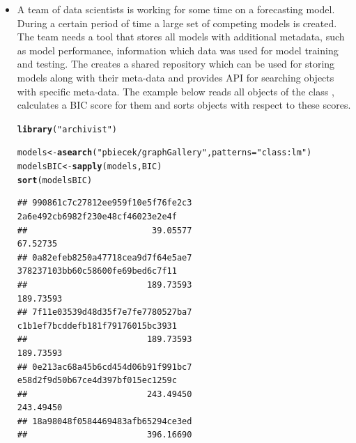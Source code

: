 \documentclass[nojss]{jss}\usepackage[]{graphicx}\usepackage[]{color}
\makeatletter
\newcommand{\hlstr}[1]{\textcolor[rgb]{0.192,0.494,0.8}{#1}}%
\newcommand{\hlstd}[1]{\textcolor[rgb]{0.345,0.345,0.345}{#1}}%
\newcommand{\hlkwb}[1]{\textcolor[rgb]{0.69,0.353,0.396}{#1}}%
\newcommand{\hlkwc}[1]{\textcolor[rgb]{0.333,0.667,0.333}{#1}}%
\newcommand{\hlkwd}[1]{\textcolor[rgb]{0.737,0.353,0.396}{\textbf{#1}}}%
\newenvironment{kframe}{%
 \def\at@end@of@kframe{}%
 \ifinner\ifhmode%
  \def\at@end@of@kframe{\end{minipage}}%
  \begin{minipage}{\columnwidth}%
 \fi\fi%
 \def\FrameCommand##1{\hskip\@totalleftmargin \hskip-\fboxsep
 \colorbox{shadecolor}{##1}\hskip-\fboxsep
     \hskip-\linewidth \hskip-\@totalleftmargin \hskip\columnwidth}%
 \MakeFramed {\advance\hsize-\width
   \@totalleftmargin\z@ \linewidth\hsize
   \@setminipage}}%
 {\par\unskip\endMakeFramed%
 \at@end@of@kframe}
\newenvironment{knitrout}{}{} %
\makeatother
\begin{document}
\begin{itemize}
\item A team of data scientists is working for some time on a forecasting model. During a certain period of time a large set of competing models is created. The team needs a tool that stores all models with additional metadata, such as model performance, information which data was used for model training and testing. The  creates a shared repository which can be used for storing models along with their meta-data and provides API for searching objects with specific meta-data. The example below reads all objects of the class , calculates a BIC score for them and sorts objects with respect to these scores.

\begin{knitrout}
\color{fgcolor}\begin{kframe}
\begin{alltt}
\hlkwd{library}\hlstd{(}\hlstr{"archivist"}\hlstd{)}
\end{alltt}


{\ttfamily\noindent\itshape\color{messagecolor}{\#\# Welcome to archivist (version: 2.1.2).}}\end{kframe}
\end{knitrout}
\begin{knitrout}
\color{fgcolor}\begin{kframe}
\begin{alltt}
\hlstd{models} \hlkwb{<-} \hlkwd{asearch}\hlstd{(}\hlstr{"pbiecek/graphGallery"}\hlstd{,} \hlkwc{patterns} \hlstd{=} \hlstr{"class:lm"}\hlstd{)}
\hlstd{modelsBIC} \hlkwb{<-} \hlkwd{sapply}\hlstd{(models, BIC)}
\hlkwd{sort}\hlstd{(modelsBIC)}
\end{alltt}
\begin{verbatim}
## 990861c7c27812ee959f10e5f76fe2c3 2a6e492cb6982f230e48cf46023e2e4f 
##                         39.05577                         67.52735 
## 0a82efeb8250a47718cea9d7f64e5ae7 378237103bb60c58600fe69bed6c7f11 
##                        189.73593                        189.73593 
## 7f11e03539d48d35f7e7fe7780527ba7 c1b1ef7bcddefb181f79176015bc3931 
##                        189.73593                        189.73593 
## 0e213ac68a45b6cd454d06b91f991bc7 e58d2f9d50b67ce4d397bf015ec1259c 
##                        243.49450                        243.49450 
## 18a98048f0584469483afb65294ce3ed 
##                        396.16690
\end{verbatim}
\end{kframe}
\end{knitrout}


\end{itemize}
\end{document}
